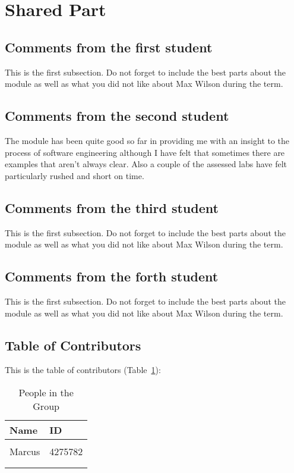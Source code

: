 \section{Shared Part}

\subsection{Comments from the first student}
This is the first subsection. Do not forget to include the best parts about the module as well as what you did not like about Max Wilson during the term.

\subsection{Comments from the second student}
The module has been quite good so far in providing me with an insight to the process of software engineering although I have felt that sometimes there are examples that aren't always clear. Also a couple of the assessed labs have felt particularly rushed and short on time.

\subsection{Comments from the third student}
This is the first subsection. Do not forget to include the best parts about the module as well as what you did not like about Max Wilson during the term.

\subsection{Comments from the forth student}
This is the first subsection. Do not forget to include the best parts about the module as well as what you did not like about Max Wilson during the term.

\subsection{Table of Contributors}

This is the table of contributors (Table~\ref{authors}):
\begin{table}[h]
\centering
\caption{People in the Group}
\label{authors}
\begin{tabular}{|l|l|}
\hline
\textbf{Name} & \textbf{ID} \\
\hline
& \\
\hline
Marcus & 4275782\\
\hline
& \\
\hline
& \\
\hline
\end{tabular}
\end{table}
